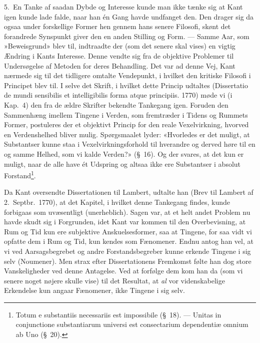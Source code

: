 \documentclass[12pt,a4paper]{article}
\newcommand{\apage}[1]{\marginnote{\footnotesize\textit{[#1]}}}
\begin{document}
5.\ En Tanke af saadan Dybde og Interesse kunde man ikke tænke sig at
Kant \apage{14} igen kunde lade falde, naar han én Gang havde undfanget den. Den
drager sig da ogsaa under forskellige Former hen gennem hans senere
Filosofi, skønt det forandrede Synspunkt giver den en anden Stilling og
Form. --- Samme Aar, som »Beweisgrund» blev til, indtraadte der (som det
senere skal vises) en vigtig Ændring i Kants Interesse. Denne vendte sig
fra de objektive Problemer til Undersøgelse af Metoden for deres
Behandling. Det var ad denne Vej, Kant nærmede sig til det tidligere
omtalte Vendepunkt, i hvilket den kritiske Filosofi i Principet blev til.
I selve det Skrift, i hvilket dette Princip udtaltes (Dissertatio
de mundi sensibilis et intelligibilis forma atque principiis. 1770) møde
vi (i Kap.\ 4) den fra de ældre Skrifter bekendte Tankegang igen.
Foruden den Sammenhæng imellem Tingene i Verden, som fremtræder i Tidens
og Rummets Former, postuleres der et objektivt Princip for den reale
Vexelvirkning, hvorved en Verdenshelhed bliver mulig. Spørgsmaalet lyder:
«Hvorledes er det muligt, at Substantser kunne staa i
Vexelvirkningsforhold til hverandre og derved høre til en og samme
Helhed, som vi kalde Verden?» (§\ 16). Og der svares, at det kun er
muligt, naar de alle have ét Udspring og altsaa ikke ere Substantser i
absolut Forstand\footnote{Totum e substantiis necessariis est
impossibile (§\ 18). --- Unitas in conjunctione substantiarum
universi est consectarium dependentiæ omnium ab Uno (§\ 20).}.

Da Kant oversendte Dissertationen til Lambert, udtalte han (Brev til
Lambert af 2.\ Septbr.\ 1770), at det Kapitel, i hvilket denne Tankegang
findes, kunde forbigaas som uvæsentligt (unerheblich). Sagen
var, at et helt andet Problem nu havde skudt sig i Forgrunden, idet Kant
var kommen til den Overbevisning, at Rum og Tid kun ere subjektive
Anskuelsesformer, saa at Tingene, for saa vidt vi opfatte dem i Rum og
Tid, kun kendes som Fænomener. Endnu antog han vel, at vi ved
Aarsagsbegrebet og andre Forstandsbegreber kunne erkende Tingene i sig
selv (Noumener). Men strax efter Dissertationens Fremkomst følte han dog
store Vanskeligheder ved denne Antagelse. Ved at forfølge dem kom han da
(som vi senere noget nøjere skulle vise) til det Resultat, at \emph{al} vor
videnskabelige Erkendelse kun angaar Fænomener, ikke Tingene i sig selv.
\end{document}
